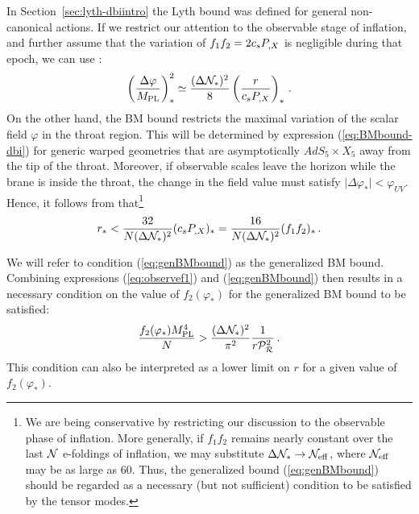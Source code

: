 In Section~\ref{sec:lyth-dbiintro} the Lyth bound was defined for general
non-canonical actions. 
If we restrict our attention to 
the observable stage of inflation, and further assume that the variation
of $f_1f_2 = 2 c_sP_{,X}$ is negligible during that epoch, we can use
: 
% 
\begin{equation}
\label{eq:genphivary1}
\left( \frac{\Delta \varphi}{M_{\mathrm{PL}}} \right)^2_{*} \simeq 
\frac{(\Delta \mathcal{N}_{*} )^2}{8} \left(\frac{r}{c_sP_{,X}}\right)_*  \,.
\end{equation}
% 
On the other hand, the BM bound restricts the maximal 
variation of the scalar field $\varphi$ in the throat region. 
This will be determined by expression (\ref{eq:BMbound-dbi}) 
for generic warped geometries that are asymptotically 
$AdS_5 \times X_5$ away from the tip of the throat. Moreover, 
if observable scales leave the horizon 
while the brane is inside the throat, the change in the field value 
must satisfy $| \Delta \varphi_*|<\varphi_{UV}$. Hence, it follows from   
 that\footnote{We are 
being conservative by restricting our discussion to the 
observable phase of inflation. More generally, if 
$f_1f_2$ remains nearly constant over the last $\mathcal{N}$ 
e-foldings of inflation, 
we may substitute $\Delta \mathcal{N}_* \rightarrow 
\mathcal{N}_\mathrm{eff}$, where $\mathcal{N}_\mathrm{eff}$ 
may be as large as 60. Thus, the generalized bound 
(\ref{eq:genBMbound}) should be regarded as a necessary 
(but not sufficient) condition to be satisfied by the tensor modes.} 
% 
\begin{equation}
\label{eq:genBMbound}
r_*< \frac{32}{N (\Delta \mathcal{N}_{*})^2} (c_sP_{,X})_* = \frac{16}{N (\Delta \mathcal{N}_{*})^2}
(f_1f_2)_* \,.
\end{equation}
% 


We will refer to condition 
(\ref{eq:genBMbound}) as the 
generalized BM bound. 
Combining expressions (\ref{eq:observef1}) and (\ref{eq:genBMbound}) then
results in a necessary condition on the value of $f_2(\varphi_*)$ 
for the generalized BM bound to be satisfied:
%  
\begin{equation}
\label{eq:f2bound}
\frac{f_2 (\varphi_*)M_{\mathrm{PL}}^4}{N} > \frac{(\Delta \mathcal{N}_*)^2}{\pi^2} 
\frac{1}{r\mathcal{P}_{\mathcal{R}}^2 } \,.
\end{equation}
% 
This condition can also be interpreted as a lower limit on $r$ 
for a given value of $f_2 (\varphi_*)$.  


